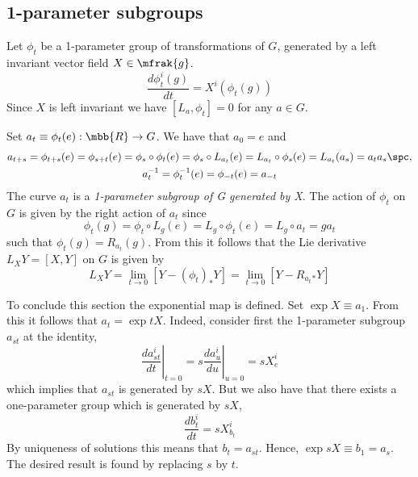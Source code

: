 \documentclass[10pt,reqno]{amsart}
\numberwithin{equation}{section}
\begin{document}

\subsection{1-parameter subgroups}

Let $\phi_t$ be a 1-parameter group of transformations of $G$, 
generated by a left invariant vector field $X \in \mfrak{g}$. 
%
\begin{equation}
	\frac{d\phi_t^i(g)}{dt} = X^i(\phi_t(g))
\end{equation}
%
Since $X$ is left invariant we have $[L_a , \phi_t] = 0$ for any 
$a \in G$.

Set $a_t \equiv \phi_t(e): \mbb{R} \rightarrow {G}$. We have that 
$a_0 = e$ and
%
\begin{displaymath}
	\begin{gathered}
		a_{t+s} = \phi_{t+s}(e) = \phi_{s+t}(e) = \phi_s \circ 
		\phi_t(e)
		= \phi_s \circ L_{a_t}(e) = L_{a_t} \circ \phi_s(e) = 
		L_{a_t}(a_s)
		= a_t a_s \spc,\\
		a_t^{-1} = \phi_t^{-1}(e) = \phi_{-t}(e) = a_{-t}
	\end{gathered}
\end{displaymath}
%
The curve $a_t$ is a \emph{1-parameter subgroup of G generated by 
	X}. The action of $\phi_t$ on $G$ is given by the right action 
of $a_t$ since
%
\begin{displaymath}
	\phi_t(g) = \phi_t \circ L_g(e) = L_g \circ \phi_t(e) = L_g 
	\circ a_t = ga_t
\end{displaymath}
%
such that $\phi_t(g) = R_{a_t}(g)$. From this it follows that the 
Lie derivative $L_X Y = [X,Y]$ on $G$ is given by
%
\begin{equation}
	L_X Y = \lim_{t\rightarrow 0} [Y - (\phi_t)_\ast Y]
	=\lim_{t\rightarrow 0} [Y - R_{a_t}{}_\ast Y]
\end{equation}
%

To conclude this section the exponential map is defined. Set 
$\exp X \equiv a_1$. From this it follows that $a_t = \exp tX$.  
Indeed, consider first the 1-parameter subgroup $a_{st}$ at the 
identity,
%
\begin{equation}
	\left.\frac{d a^i_{st}}{dt}\right|_{t=0} = s\left.\frac{d 
		a^i_u}{du}\right|_{u=0} = s X^i_e
\end{equation}
%
which implies that $a_{st}$ is generated by $sX$. But we also 
have that there exists a one-parameter group which is generated 
by $sX$,
%
\begin{equation}
	\frac{db^i_t}{dt} = sX^i_{b_t}
\end{equation}
%
By uniqueness of solutions this means that $b_t = a_{st}$. Hence, 
$\exp sX \equiv b_1 = a_s$. The desired result is found by 
replacing $s$ by $t$.
\end{document}
